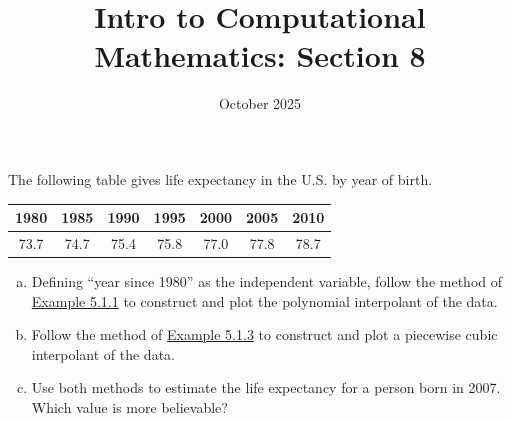 \documentclass[11pt]{article}
\title{Intro to Computational Mathematics: Section 8}
\date{October 2025}
\newenvironment{problem}[2][Q]{\begin{trivlist}
\item[\hskip \labelsep {\bfseries #1}{\bfseries #2}]}{\end{trivlist}}
\theoremstyle{definition}
\begin{document}
\maketitle

\begin{problem}{5.1.2}
    The following table gives life expectancy in the U.S. by year of birth.
    
    \begin{center}
    \begin{tabular}{c|c|c|c|c|c|c}
        \textbf{1980} & \textbf{1985} & \textbf{1990} & \textbf{1995} & \textbf{2000} & \textbf{2005} & \textbf{2010} \\\hline
        73.7 & 74.7 & 75.4 & 75.8 & 77.0 & 77.8 & 78.7
    \end{tabular}
    \end{center}
    
    \begin{enumerate}[(a)]
        \item Defining ``year since 1980'' as the independent variable, follow the method of \href{https://fncbook.com/interpolation/#demo-interpolation-global}{Example 5.1.1} to construct and plot the polynomial interpolant of the data.
        \item Follow the method of \href{https://fncbook.com/interpolation/#demo-interpolation-pwise}{Example 5.1.3} to construct and plot a piecewise cubic interpolant of the data.
        \item Use both methods to estimate the life expectancy for a person born in 2007. Which value is more believable?
    \end{enumerate}
\end{problem}
\end{document}
